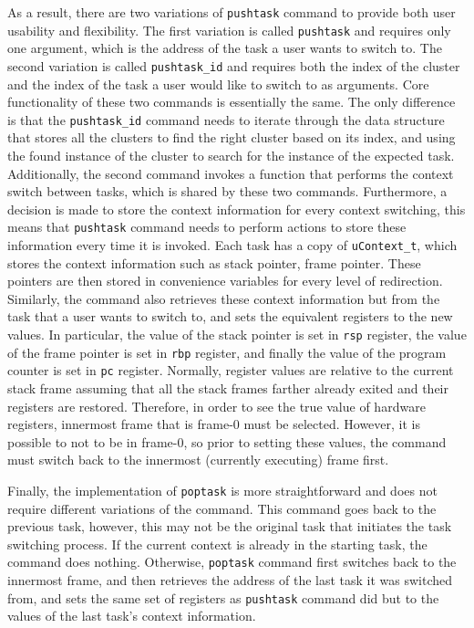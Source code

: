 As a result, there are two variations of \verb|pushtask| command to provide both
user usability and flexibility. The first variation is called \verb|pushtask| and requires
only one argument, which is the address of the task a user wants to switch to.
The second variation is called \verb|pushtask_id| and requires both the index of
the cluster and the index of the task a user would like
to switch to as arguments. Core functionality of these two commands is
essentially the same. The only difference is that the \verb|pushtask_id| command
needs to iterate through the data structure that stores all the clusters to find
the right cluster based on its index, and using the found instance of the
cluster to search for the instance of the expected task. Additionally, the second
command invokes a function that performs the context switch between tasks, which
is shared by these two commands. Furthermore, a decision
is made to store the context information for every context switching, this means
that \verb|pushtask| command needs to perform actions to store these information every time it is
invoked. Each task has a copy of \verb|uContext_t|, which stores the context
information such as stack pointer, frame pointer. These pointers are then stored
in convenience variables for every level of redirection. Similarly, the command
also retrieves these context information but from the task that a user wants to switch to, and
sets the equivalent registers to the new values. In particular, the value of the stack
pointer is set in \verb|rsp| register, the value of the frame pointer is set in \verb|rbp|
register, and finally the value of the program counter is set in \verb|pc| register.
Normally, register values are relative to the current stack frame assuming that
all the stack frames farther already exited and their registers are restored. Therefore, in
order to see the true value of hardware registers, innermost frame that is
frame-0 must be selected\cite{reference11}. However, it is possible to not to be in frame-0, so prior to setting these values,
the command must switch back to the innermost (currently executing) frame first.

Finally, the implementation of \verb|poptask| is more straightforward and does
not require different variations of the command. This command goes back to the previous task, however, this may not be the original
task that initiates the task switching process. If the current context is
already in the starting task, the command does nothing. Otherwise,
\verb|poptask| command first switches back to the innermost frame, and then
retrieves the
address of the last task it was switched from, and sets the same set of registers as
\verb|pushtask| command did but to the values of the last task's context
information.

